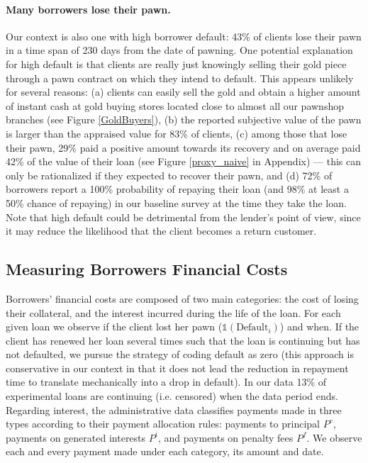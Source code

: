 \documentclass[oneside,11pt]{article}
\begin{document}
\paragraph{Many borrowers lose their pawn.} Our context is also one with high borrower default: 43\% of clients lose their pawn in a time span of 230 days from the date of pawning. One potential explanation for high default is that clients are really just knowingly selling their gold piece through a pawn contract on which they intend to default. This appears unlikely for several reasons: (a) clients can easily sell the gold and obtain a higher amount of instant cash at gold buying stores located close to almost all our pawnshop branches (see Figure \ref{GoldBuyers}), (b) the reported subjective value of the pawn is larger than the appraised value for 83\% of clients, (c) among those that lose their pawn, 29\% paid a positive amount towards its recovery and on average paid 42\% of the value of their loan (see Figure \ref{proxy_naive} in Appendix) --- this can only be rationalized if they expected to recover their pawn, and (d) 72\% of borrowers report a 100\% probability of repaying their loan (and 98\% at least a 50\% chance of repaying) in our baseline survey at the time they take the loan.  Note that high default could be detrimental from the lender's point of view, since it may reduce the likelihood that the client becomes a return customer. 

    
\subsection{Measuring Borrowers Financial Costs} 
\label{costs}
    
Borrowers' financial costs are composed of two main categories: the cost of losing their collateral, and the interest incurred during the life of the loan. For each given loan we observe if the client lost her pawn ($\mathds{1}(\text{Default}_i)$) and when. If the client has renewed her loan several times such that the loan is continuing but has not defaulted, we pursue the strategy of coding default as zero (this approach is conservative in our context in that it does not lead the reduction in repayment time to translate mechanically into a drop in default). In our data 13\% of experimental loans are continuing (i.e. censored) when the data period ends. Regarding interest, the administrative data classifies payments made in three types according to their payment allocation rules: payments to principal $P^c$, payments on generated interests $P^i$, and payments on penalty fees $P^f$. We observe each and every payment made under each category, its amount and date. 
\end{document}
